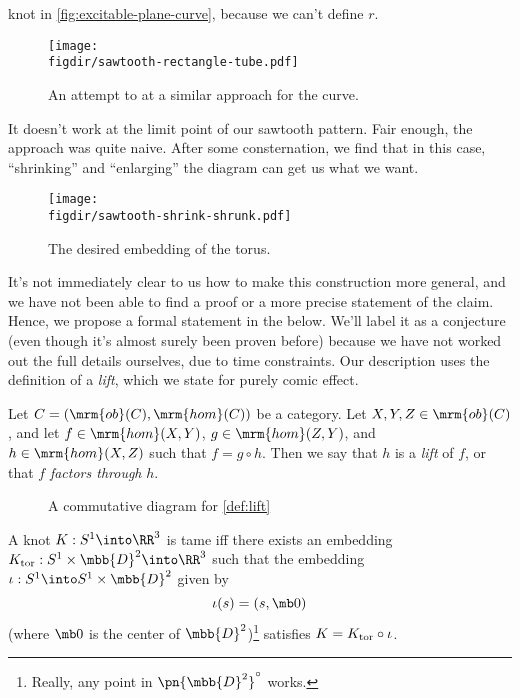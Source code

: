 knot in \cref{fig:excitable-plane-curve}, because we can't define $r$.
\begin{figure}[H]
  \centering
  \texttt{[image: \\figdir/sawtooth-rectangle-tube.pdf]}
  \caption{An attempt to at a similar approach for the curve.}
\end{figure}
It doesn't work at the limit point of our sawtooth pattern. Fair
enough, the approach was quite naive. After some consternation, we
find that in this case, ``shrinking'' and ``enlarging'' the diagram
can get us what we want.
\begin{figure}[H]
  \centering
  \texttt{[image: \\figdir/sawtooth-shrink-shrunk.pdf]}
  \caption{The desired embedding of the torus.}
\end{figure}
It's not immediately clear to us how to make this construction more
general, and we have not been able to find a proof or a more precise
statement of the claim. Hence, we propose a formal statement in the
below. We'll label it as a conjecture (even though it's almost surely
been proven before) because we have not worked out the full details
ourselves, due to time constraints. Our description uses the
definition of a \emph{lift}, which we state for purely comic effect.
\begin{definition}\label{def:lift}
  Let $C = (\mrm{ob}(C), \mrm{hom}(C))$ be a category. Let $X,Y,Z \in
  \mrm{ob}(C)$, and let $f \in \mrm{hom}(X,Y)$, $g \in
  \mrm{hom}(Z,Y)$, and $h \in \mrm{hom}(X,Z)$ such that $f = g \circ
  h$. Then we say that $h$ is a \emph{lift} of $f$, or that $f$
  \emph{factors through} $h$.
\end{definition}
\begin{figure}[H]
  \centering
  \caption{A commutative diagram for \cref{def:lift}}
\end{figure}
\begin{conjecture}\label{prop:lift-to-solid-torus}
  A knot $K : S^1 \into \RR^3$ is tame iff there exists an embedding
  $K_{\rm tor} : S^1\times \mbb{D}^2 \into \RR^3$ such that the
  embedding $\iota : S^1 \into S^1 \times \mbb{D}^2$ given by
  \[
    \iota(s) = (s, \mb 0)
  \]
  (where $\mb 0$ is the center of $\mbb{D}^2$)\footnote{Really, any
    point in $\pn{\mbb{D}^2}^\circ$ works.} satisfies $K = K_{\rm
  tor} \circ \iota$.
\end{conjecture}
